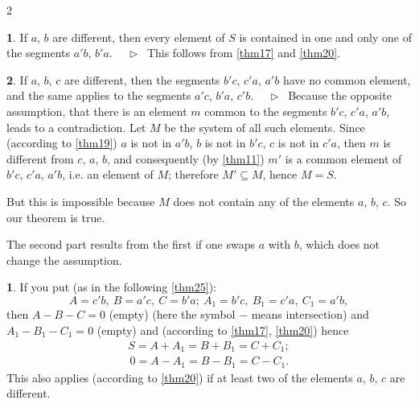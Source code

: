 \documentclass[leqno,hidelinks,10pt]{article}
\theoremstyle{definition}
\newtheorem{satz}{\protect\satzname}
\newtheorem*{zusatz}{\protect\zusatzname}
\newcommand{\satzname}{}
\newcommand{\zusatzname}{}
\renewcommand{\satzname}{\hspace{-4pt}.\ Satz}%
\renewcommand{\zusatzname}{Zusatz}%
\renewcommand{\satzname}{\hspace{-4pt}.\ Theorem}%
\renewcommand{\zusatzname}{Corollary}%
\newcommand\Beweis{\medskip \newline $ \phantom{'.'} \rhd \ $}%
\newcommand{\partof}{\subseteq}
\newcommand{\sref}[1]{\underline{\ref{#1}}}%
\begin{document}
\begin{paracol}{2}
\begin{rightcolumn}
\begin{satz}\label{thm23}
If $a$, $b$ are different, then every element of $S$ is contained in one and only
one of the segments $a'b$, $b'a$.
\Beweis
This follows from \sref{thm17} and \sref{thm20}.
\end{satz}

\begin{satz}\label{thm24}
If $a$, $b$, $c$ are different, then the segments $b'c$, $c'a$, $a'b$ have no
common element, and the same applies to the segments $a'c$, $b'a$, $c'b$.
\Beweis
Because the opposite assumption, that there is an element $m$ common to the segments
$b'c$, $c'a$, $a'b$, leads to a contradiction. Let $M$ be the system of all such
elements. Since (according to \sref{thm19}) $a$ is not in $a'b$, $b$ is not in $b'c$,
$c$ is not in $c'a$, then $m$ is different from $c$, $a$, $b$, and consequently
(by \sref{thm11}) $m'$ is a common element of $b'c$, $c'a$, $a'b$, i.e. an element
of $M$; therefore $M' \partof M$, hence  $M=S$.

But this is impossible because $M$ does not contain any of the elements $a$, $b$,
$c$. So our theorem is true.

The second part results from the first if one swaps $a$ with $b$, which does not
change the assumption.
\end{satz}

\begin{zusatz}\label{corollary1}
If you put (as in the following \sref{thm25}):
\[
    A = c'b,\ B = a'c,\ C = b'a;\  A_1 = b'c,\ B_1 = c'a,\ C_1 = a'b,
\]
then $A - B - C = 0$ (empty) (here the symbol $-$ means intersection) and
$A_1 - B_1 - C_1 = 0$ (empty) and (according to \sref{thm17}, \sref{thm20}) hence
\begin{gather*}
    S = A + A_1 = B + B_1 = C + C_1; \\
    \,0 = A - A_1 = B - B_1 = C - C_1.
\end{gather*}
This also applies (according to \sref{thm20}) if at least two of the elements
$a$, $b$, $c$ are different.
\end{zusatz}


\end{rightcolumn}
\end{paracol}
\end{document}
